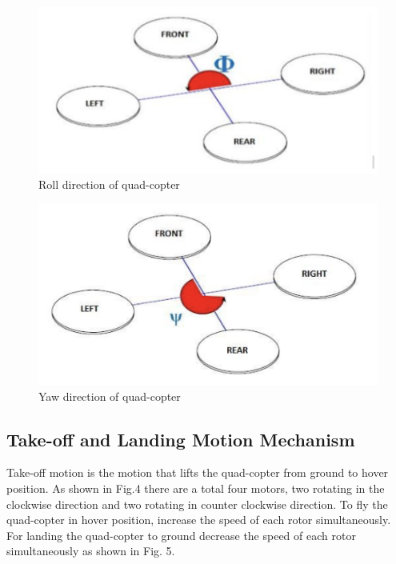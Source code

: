 \documentclass[a4paper,twoside]{iiththesis}
\begin{document}
\begin{figure}[h!]
\caption{Roll direction of quad-copter}
\label{Roll direction of quadcopter}
\centering
\includegraphics[width=\columnwidth]{./Figures/roll_direction.png}
\end{figure}

\begin{figure}[h!]
\caption{Yaw direction of quad-copter}
\label{Yaw direction of quadcopter}
\centering
\includegraphics[width=\columnwidth]{./Figures/yaw_dir_qc.png}
\end{figure}

\subsection{Take-off and Landing Motion Mechanism}
\par Take-off motion is the motion that lifts the quad-copter from ground to hover position. As shown in Fig.4 there are a total four motors, two rotating in the clockwise direction and two rotating in counter clockwise direction. To fly the quad-copter in hover position, increase the speed of each rotor simultaneously. For landing the quad-copter to ground decrease the speed of each rotor simultaneously as shown in Fig. 5.
\end{document}
